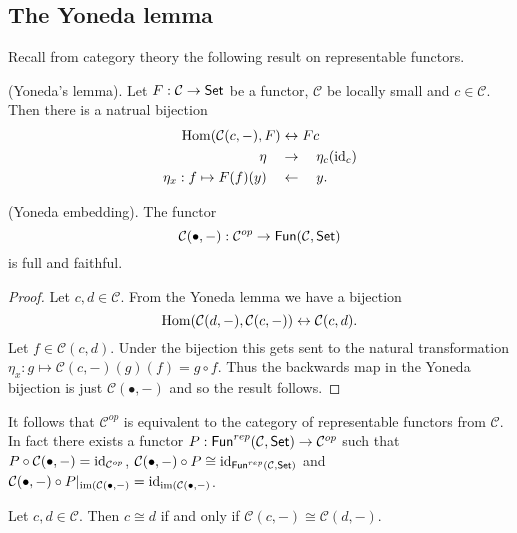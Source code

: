 \documentclass{memoir}
\begin{document}
\subsection{The Yoneda lemma}
Recall from category theory the following result on representable functors.
\begin{theorem}
    (Yoneda's lemma).
    Let $F:\mathcal C\to {\normalfont\mathsf{Set}}$ be a functor, $\mathcal C$ be locally small and $c\in \mathcal C$. Then there is a natrual bijection
    \begin{align}
        \operatorname{Hom}(\mathcal C(c,-),F) &\leftrightarrow Fc \\
        \eta \quad &\rightarrow \quad \eta_c(\operatorname{id}_c) \nonumber \\
        \eta_x: f\mapsto F(f)(y) \quad &\leftarrow \quad y. \nonumber 
    \end{align}
\end{theorem}
\begin{corollary}
    (Yoneda embedding).
    The functor 
    \begin{equation}
        \mathcal C(\bullet,-):\mathcal C^{op}\to {\normalfont\mathsf{Fun}}(\mathcal C, {\normalfont\mathsf{Set}})
    \end{equation}
    is full and faithful.
\end{corollary}
\begin{proof}
    Let $c,d\in \mathcal C$.
    From the Yoneda lemma we have a bijection
    \begin{equation}
        \operatorname{Hom}(\mathcal C(d,-),\mathcal C(c,-)) \leftrightarrow \mathcal C(c,d).
    \end{equation}
    Let $f\in \mathcal C(c,d)$. 
    Under the bijection this gets sent to the natural transformation $\eta_x: g\mapsto \mathcal C(c,-)(g)(f) = g\circ f$.
    Thus the backwards map in the Yoneda bijection is just $\mathcal C(\bullet, -)$ and so the result follows.
\end{proof}
\begin{remark}
    It follows that $\mathcal C^{op}$ is equivalent to the category of representable functors from $\mathcal C$.
    In fact there exists a functor $P:{\normalfont\mathsf{Fun}}^{rep}(\mathcal C,{\normalfont\mathsf{Set}}) \to \mathcal C^{op}$ such that $P\circ \mathcal C(\bullet,-) = \operatorname{id}_{\mathcal C^{op}}$, $\mathcal C(\bullet,-)\circ P \cong \operatorname{id}_{{\normalfont\mathsf{Fun}}^{rep}(\mathcal C,{\normalfont\mathsf{Set}})}$ and $\mathcal C(\bullet,-)\circ P|_{\operatorname{im}(\mathcal C(\bullet,-)} = \operatorname{id}_{\operatorname{im}(\mathcal C(\bullet,-)}$.
\end{remark}
\begin{corollary}
    Let $c,d\in \mathcal C$. 
    Then $c\cong d$ if and only if $\mathcal C(c,-) \cong \mathcal C(d,-)$.
\end{corollary}
\end{document}

